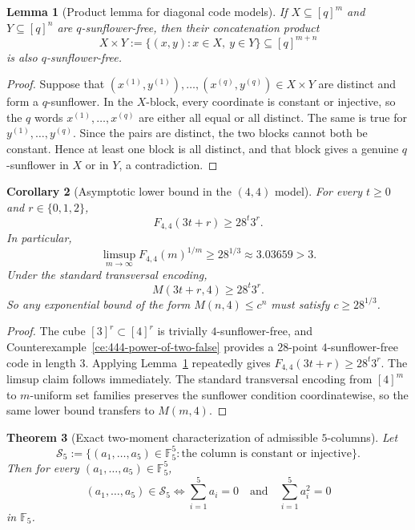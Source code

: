 \documentclass[11pt]{article}
\newtheorem{theorem}{Theorem}[section]
\newtheorem{lemma}[theorem]{Lemma}
\newtheorem{corollary}[theorem]{Corollary}
\theoremstyle{definition}
\newcommand{\1}{\mathbf{1}}
\begin{document}
\begin{lemma}[Product lemma for diagonal code models]\label{lem:code-product}
If $X\subseteq [q]^m$ and $Y\subseteq [q]^n$ are $q$-sunflower-free, then their concatenation product
\[
X\times Y:=\{(x,y):x\in X,\ y\in Y\}\subseteq [q]^{m+n}
\]
is also $q$-sunflower-free.
\end{lemma}

\begin{proof}
Suppose that $(x^{(1)},y^{(1)}),\dots,(x^{(q)},y^{(q)})\in X\times Y$ are distinct and form a $q$-sunflower. In the $X$-block, every coordinate is constant or injective, so the $q$ words $x^{(1)},\dots,x^{(q)}$ are either all equal or all distinct. The same is true for $y^{(1)},\dots,y^{(q)}$. Since the pairs are distinct, the two blocks cannot both be constant. Hence at least one block is all distinct, and that block gives a genuine $q$-sunflower in $X$ or in $Y$, a contradiction.
\end{proof}

\begin{corollary}[Asymptotic lower bound in the $(4,4)$ model]\label{cor:444-asymp-lower}
For every $t\ge 0$ and $r\in\{0,1,2\}$,
\[
F_{4,4}(3t+r)\ge 28^t3^r.
\]
In particular,
\[
\limsup_{m\to\infty} F_{4,4}(m)^{1/m}\ge 28^{1/3}\approx 3.03659>3.
\]
Under the standard transversal encoding,
\[
M(3t+r,4)\ge 28^t3^r.
\]
So any exponential bound of the form $M(n,4)\le c^n$ must satisfy $c\ge 28^{1/3}$.
\end{corollary}

\begin{proof}
The cube $[3]^r\subset [4]^r$ is trivially $4$-sunflower-free, and Counterexample~\ref{ce:444-power-of-two-false} provides a $28$-point $4$-sunflower-free code in length $3$. Applying Lemma~\ref{lem:code-product} repeatedly gives $F_{4,4}(3t+r)\ge 28^t3^r$. The limsup claim follows immediately. The standard transversal encoding from $[4]^m$ to $m$-uniform set families preserves the sunflower condition coordinatewise, so the same lower bound transfers to $M(m,4)$.
\end{proof}

\begin{theorem}[Exact two-moment characterization of admissible $5$-columns]\label{thm:5column-two-moment}
Let
\[
\mathcal S_5:=\{(a_1,\dots,a_5)\in \mathbb F_5^5: \text{the column is constant or injective}\}.
\]
Then for every $(a_1,\dots,a_5)\in \mathbb F_5^5$,
\[
(a_1,\dots,a_5)\in \mathcal S_5
\iff
\sum_{i=1}^5 a_i=0
\quad\text{and}\quad
\sum_{i=1}^5 a_i^2=0
\]
in $\mathbb F_5$.
\end{theorem}
\end{document}
